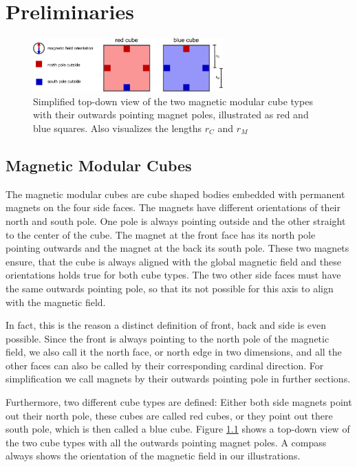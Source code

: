 \chapter{Preliminaries}

\begin{figure}
	\centering
	\includegraphics[width=0.65\textwidth]{figures/magnetic_cubes.pdf}
	\caption{Simplified top-down view of the two magnetic modular cube types with their outwards pointing magnet poles, illustrated as red and blue squares. Also visualizes the lengths $r_C$ and $r_M$}
	\label{fig:magnetic_cubes}
\end{figure}

\section{Magnetic Modular Cubes}
The magnetic modular cubes are cube shaped bodies embedded with permanent magnets on the four side faces.
The magnets have different orientations of their north and south pole. 
One pole is always pointing outside and the other straight to the center of the cube.
The magnet at the front face has its north pole pointing outwards and the magnet at the back its south pole.
These two magnets ensure, that the cube is always aligned with the global magnetic field and these orientations holds true for both cube types.
The two other side faces must have the same outwards pointing pole, so that its not possible for this axis to align with the magnetic field.

In fact, this is the reason a distinct definition of front, back and side is even possible.
Since the front is always pointing to the north pole of the magnetic field, we also call it the north face, or north edge in two dimensions, and all the other faces can also be called by their corresponding cardinal direction.
For simplification we call magnets by their outwards pointing pole in further sections.

Furthermore, two different cube types are defined:
Either both side magnets point out their north pole, these cubes are called red cubes, or they point out there south pole, which is then called a blue cube.
Figure \ref{fig:magnetic_cubes} shows a top-down view of the two cube types with all the outwards pointing magnet poles.
A compass always shows the orientation of the magnetic field in our illustrations.

